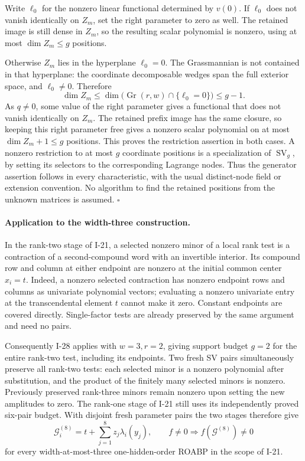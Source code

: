 Write $\ell_0$ for the nonzero linear functional determined
by $v(0)$.  If $\ell_0$ does not vanish identically on $Z_m$,
set the right parameter to zero as well.  The retained image
is still dense in $Z_m$, so the resulting scalar polynomial
is nonzero, using at most $\dim Z_m\le g$ positions.

Otherwise $Z_m$ lies in the hyperplane $\ell_0=0$.
The Grassmannian is not contained in that hyperplane:
the coordinate decomposable wedges span the full exterior
space, and $\ell_0\ne0$.  Therefore
\[
 \dim Z_m\le \dim\bigl(\operatorname{Gr}(r,w)
                                  \cap\{\ell_0=0\}\bigr)\le g-1.
\]
As $q\ne0$, some value of the right parameter gives a
functional that does not vanish identically on $Z_m$.
The retained prefix image has the same closure, so keeping
this right parameter free gives a nonzero scalar polynomial
on at most $\dim Z_m+1\le g$ positions.  This proves the
restriction assertion in both cases.  A nonzero restriction
to at most $g$ coordinate positions is a specialization of
$\operatorname{SV}_g$, by setting its selectors to the
corresponding Lagrange nodes.  Thus the generator assertion
follows in every characteristic, with the usual distinct-node
field or extension convention.  No algorithm to find the
retained positions from the unknown matrices is assumed.
\hfill$\square$

\paragraph{Application to the width-three construction.}
In the rank-two stage of I-21, a selected nonzero minor of
a local rank test is a contraction of a second-compound
word with an invertible interior.  Its compound row and
column at either endpoint are nonzero at the initial common
center $x_i=t$.  Indeed, a nonzero selected contraction has
nonzero endpoint rows and columns as univariate polynomial
vectors; evaluating a nonzero univariate entry at the
transcendental element $t$ cannot make it zero.  Constant
endpoints are covered directly.  Single-factor tests are
already preserved by the same argument and need no pairs.

Consequently I-28 applies with $w=3,r=2$, giving support
budget $g=2$ for the entire rank-two test, including its
endpoints.  Two fresh SV pairs simultaneously preserve all
rank-two tests: each selected minor is a nonzero polynomial
after substitution, and the product of the finitely many
selected minors is nonzero.  Previously preserved rank-three
minors remain nonzero upon setting the new amplitudes to zero.
The rank-one stage of I-21 still uses its independently
proved six-pair budget.  With disjoint fresh parameter pairs
the two stages therefore give
\[
 \mathcal G_i^{(8)}
      =t+\sum_{j=1}^{8}z_j\lambda_i(y_j),
 \qquad f\ne0\Longrightarrow f(\mathcal G^{(8)})\ne0
 \tag{I.40}
\]
for every width-at-most-three one-hidden-order ROABP in the
scope of I-21.

